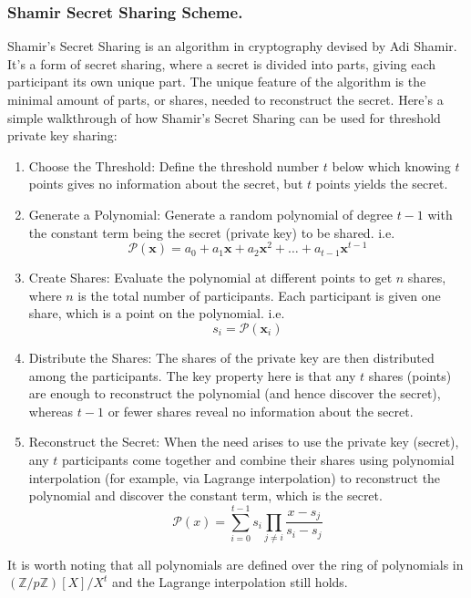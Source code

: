 \documentclass[11pt]{article}
\begin{document}
\subsubsection{Shamir Secret Sharing Scheme.}
Shamir's Secret Sharing is an algorithm in cryptography devised by Adi Shamir. It's a form of secret sharing, where a secret is divided into parts, giving each participant its own unique part. The unique feature of the algorithm is the minimal amount of parts, or shares, needed to reconstruct the secret.
Here's a simple walkthrough of how Shamir's Secret Sharing can be used for threshold private key sharing:
\begin{enumerate}
\item Choose the Threshold: Define the threshold number $t$ below which knowing $t$ points gives no information about the secret, but $t$ points yields the secret.
\item Generate a Polynomial: Generate a random polynomial of degree $t-1$ with the constant term being the secret (private key) to be shared. i.e. \begin{equation}\mathcal{P}(\mathbf{x})=a_0+a_1\mathbf{x}+a_2\mathbf{x}^2+\ldots+a_{t-1}\mathbf{x}^{t-1}
\end{equation}
\item Create Shares: Evaluate the polynomial at different points to get $n$ shares, where $n$ is the total number of participants. Each participant is given one share, which is a point on the polynomial. i.e. \begin{equation}s_i=\mathcal{P}(\mathbf{x}_i)\end{equation}
\item Distribute the Shares: The shares of the private key are then distributed among the participants.
The key property here is that any $t$ shares (points) are enough to reconstruct the polynomial (and hence discover the secret), whereas $t-1$ or fewer shares reveal no information about the secret.
\item Reconstruct the Secret: When the need arises to use the private key (secret), any $t$ participants come together and combine their shares using polynomial interpolation (for example, via Lagrange interpolation) to reconstruct the polynomial and discover the constant term, which is the secret.
\begin{equation}
\mathcal{P}(x)=\sum^{t-1}_{i=0}s_i\prod_{j\neq i}\frac{x-s_j}{s_i-s_j}
\end{equation}

\end{enumerate}
It is worth noting that all polynomials are defined over the ring of polynomials in $(\mathbb{Z}/p\mathbb{Z})[X]/X^{t}$ and the Lagrange interpolation still holds.
\end{document}
